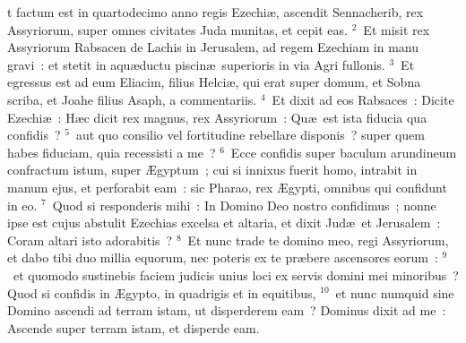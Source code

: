 \bchapter
{}t factum est in quartodecimo anno regis Ezechi\ae , ascendit Sennacherib, rex Assyriorum, super omnes civitates Juda munitas, et cepit eas.
${}^{2}$~Et misit rex Assyriorum Rabsacen de Lachis in Jerusalem, ad regem Ezechiam in manu gravi~: et stetit in aqu\ae ductu piscin\ae\ superioris in via Agri fullonis.
${}^{3}$~Et egressus est ad eum Eliacim, filius Helci\ae , qui erat super domum, et Sobna scriba, et Joahe filius Asaph, a commentariis.
${}^{4}$~Et dixit ad eos Rabsaces~: Dicite Ezechi\ae~: H\ae c dicit rex magnus, rex Assyriorum~: Qu\ae\ est ista fiducia qua confidis~?
${}^{5}$~aut quo consilio vel fortitudine rebellare disponis~? super quem habes fiduciam, quia recessisti a me~?
${}^{6}$~Ecce confidis super baculum arundineum confractum istum, super \AE gyptum~; cui si innixus fuerit homo, intrabit in manum ejus, et perforabit eam~: sic Pharao, rex \AE gypti, omnibus qui confidunt in eo.
${}^{7}$~Quod si responderis mihi~: In Domino Deo nostro confidimus~; nonne ipse est cujus abstulit Ezechias excelsa et altaria, et dixit Jud\ae\ et Jerusalem~: Coram altari isto adorabitis~?
${}^{8}$~Et nunc trade te domino meo, regi Assyriorum, et dabo tibi duo millia equorum, nec poteris ex te pr\ae bere ascensores eorum~:
${}^{9}$~et quomodo sustinebis faciem judicis unius loci ex servis domini mei minoribus~? Quod si confidis in \AE gypto, in quadrigis et in equitibus,
${}^{10}$~et nunc numquid sine Domino ascendi ad terram istam, ut disperderem eam~? Dominus dixit ad me~: Ascende super terram istam, et disperde eam.


